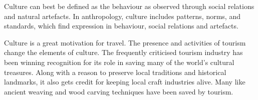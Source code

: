 Culture can best be defined as the behaviour as observed through social relations and natural artefacts. In anthropology, culture includes patterns, norms, and standards, which find expression in behaviour, social relations and artefacts.

Culture is a great motivation for travel. The presence and activities of tourism change the elements of culture. The frequently criticised tourism industry has been winning recognition for its role in saving many of the world's cultural treasures. Along with a reason to preserve local traditions and historical landmarks, it also gets credit for keeping local craft industries alive. Many like ancient weaving and wood carving techniques have been saved by tourism.


